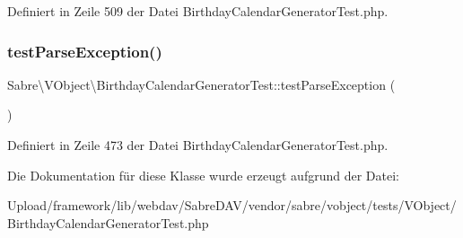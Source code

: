 Definiert in Zeile 509 der Datei Birthday\+Calendar\+Generator\+Test.\+php.

\mbox{\label{class_sabre_1_1_v_object_1_1_birthday_calendar_generator_test_a06dbe53a0b2232d512e63de761cba3aa}} 
\subsubsection{\texorpdfstring{test\+Parse\+Exception()}{testParseException()}}
{\footnotesize\ttfamily Sabre\textbackslash{}\+V\+Object\textbackslash{}\+Birthday\+Calendar\+Generator\+Test\+::test\+Parse\+Exception (\begin{DoxyParamCaption}{ }\end{DoxyParamCaption})}



Definiert in Zeile 473 der Datei Birthday\+Calendar\+Generator\+Test.\+php.



Die Dokumentation für diese Klasse wurde erzeugt aufgrund der Datei\+:\begin{DoxyCompactItemize}
\item 
Upload/framework/lib/webdav/\+Sabre\+D\+A\+V/vendor/sabre/vobject/tests/\+V\+Object/Birthday\+Calendar\+Generator\+Test.\+php\end{DoxyCompactItemize}
